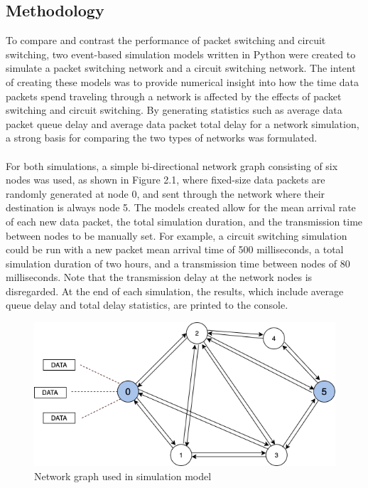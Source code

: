 \documentclass{article}
\begin{document}
  \subsection{Methodology}

  To compare and contrast the performance of packet switching and circuit switching, two event-based simulation models
  written in Python were created to simulate a packet switching network and a circuit switching network. The intent of
  creating these models was to provide numerical insight into how the time data packets spend traveling through a network
  is affected by the effects of packet switching and circuit switching. By generating statistics such as average data packet
  queue delay and average data packet total delay for a network simulation, a strong basis for comparing the two types of
  networks was formulated.\\\\
  For both simulations, a simple bi-directional network graph consisting of six nodes was used, as shown in Figure 2.1, where fixed-size data packets
  are randomly generated at node 0, and sent through the network where their destination is always node 5. The models
  created allow for the mean arrival rate of each new data packet, the total simulation duration, and the transmission time
  between nodes to be manually set. For example, a circuit switching simulation could be run with a new packet mean arrival time of 500 milliseconds, a
  total simulation duration of two hours, and a transmission time between nodes of 80 milliseconds. Note that the transmission delay
  at the network nodes is disregarded. At the end of each simulation, the results, which include average queue delay and total delay statistics, are printed to the console.

  \begin{figure}[h]
  \centering
          \includegraphics[totalheight=6cm]{images/network_graph.png}
  \renewcommand\figurename{Figure}
      \caption{Network graph used in simulation model}
      \label{fig:networkgraph}
  \end{figure}
\end{document}
